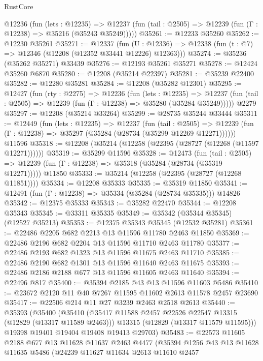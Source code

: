 \begin{lexlean}{RustCore}
\begin{coremodule}
    @12236
      (fun (lets : @12235) =>
      @12237 (fun (tail : @2505) => @12239 (fun (Γ : @12238) => @35216 (@35243 @35249)))))
@35261 := @12233 @35260
@35262 := @12230 @35261
@35271 := @12337
    (fun (U : @12336) => @12338 (fun (t : @7) => @12346 (@12208 (@12352 @33441 @12226) @12363)))
@35274 := @35236 (@35262 @35271) @33439
@35276 := @12193 @35261 @35271
@35278 := @12424 @35260 @6870
@35280 := @12208 (@35214 @22397)
@35281 := @35239 @22400
@35282 := @12280 @35281
@35284 := @12208 (@35282 @12301)
@35295 := @12427
    (fun (rty : @2275) =>
    @12236
      (fun (lets : @12235) =>
      @12237 (fun (tail : @2505) => @12239 (fun (Γ : @12238) => @35280 (@35284 @35249)))))
    @2279
@35297 := @12208 (@35214 @33264)
@35299 := @28735 @35244 @33444
@35311 := @12449
    (fun (lets : @12235) =>
    @12237
      (fun (tail : @2505) =>
      @12239 (fun (Γ : @12238) => @35297 (@35284 (@28734 (@35299 @12269 @12271))))))
    @11596
@35318 := @12208 (@35214 (@12258 (@22395 (@28727 (@12268 (@11597 @12271))))))
@35319 := @35299 @11596
@35328 := @12473
    (fun (tail : @2505) => @12239 (fun (Γ : @12238) => @35318 (@35284 (@28734 (@35319 @12271)))))
    @11850
@35333 := @35214 (@12258 (@22395 (@28727 (@12268 @11851))))
@35334 := @12208 @35333
@35335 := @35319 @11850
@35341 := @12491 (fun (Γ : @12238) => @35334 (@35284 (@28734 @35335))) @14826
@35342 := @12375 @35333
@35343 := @35282 @22470
@35344 := @12208 @35343
@35345 := @33311 @35335
@35349 := @35342 (@35344 @35345) (@12527 @35213)
@35353 := @12375 @35343 @35345 (@12532 @35281)
@35361 := @22486 @2205 @682 @2213 @13 @11596 @11780 @2463 @11850
@35369 := @22486 @2196 @682 @2204 @13 @11596 @11710 @2463 @11780
@35377 := @22486 @2193 @682 @1323 @13 @11596 @11675 @2463 @11710
@35385 := @22486 @2190 @682 @1301 @13 @11596 @11640 @2463 @11675
@35393 := @22486 @2186 @2188 @677 @13 @11596 @11605 @2463 @11640
@35394 := @22496 @817
@35400 := @35394 @2185 @43 @13 @11596 @11603 @5486
@35410 := @23672 @2120 @11 @40 @7267 @11595 @11602 @2613 @11578 @2457 @23690
@35417 := @22506 @214 @11 @27 @3239 @2463 @2518 @2613
@35440 := @35393
    (@35400
      (@35410
        (@35417 @11588 @2457 @22526 @22547 @13315 (@12829 (@13317 @11589 @2463)))
        @13315
        (@12829 (@13317 @11579 @11595)))
      @19398
      @19401
      @19404
      @19408
      @19413
      @29703)
@35483 := @22573
    @11605
    @2188
    @677
    @13
    @11628
    @11637
    @2463
    @4477
    (@35394
      @1256
      @43
      @13
      @11628
      @11635
      @5486
      (@24239
        @11627
        @11634
        @2613
        @11610
        @2457

\end{coremodule}
\end{lexlean}
